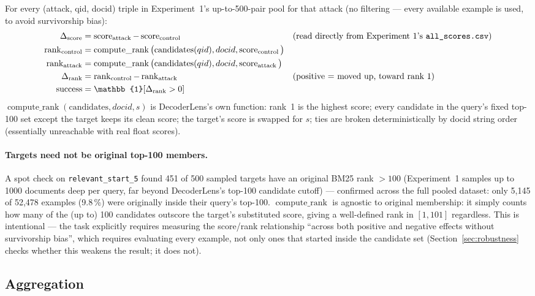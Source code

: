 \documentclass[11pt]{article}
\newcommand{\score}{\operatorname{score}}
\newcommand{\rank}{\operatorname{rank}}
\begin{document}
For every (attack, qid, docid) triple in Experiment~1's up-to-500-pair pool
for that attack (no filtering — every available example is used, to avoid
survivorship bias):
\begin{align}
\Delta_{\score} &= \score_{\text{attack}} - \score_{\text{control}}
  &&\text{(read directly from Experiment~1's \texttt{all\_scores.csv})} \\
\rank_{\text{control}} &= \operatorname{compute\_rank}\big(\text{candidates}(qid), docid, \score_{\text{control}}\big) \\
\rank_{\text{attack}}  &= \operatorname{compute\_rank}\big(\text{candidates}(qid), docid, \score_{\text{attack}}\big) \\
\Delta_{\rank} &= \rank_{\text{control}} - \rank_{\text{attack}}
  &&\text{(positive = moved up, toward rank 1)} \\
\text{success} &= \mathbb{1}[\Delta_{\rank} > 0]
\end{align}
$\operatorname{compute\_rank}(\text{candidates}, docid, s)$ is
DecoderLens's own function: rank~1 is the highest score; every candidate
in the query's fixed top-100 set except the target keeps its clean score;
the target's score is swapped for $s$; ties are broken deterministically by
docid string order (essentially unreachable with real float scores).

\paragraph{Targets need not be original top-100 members.} A spot check on
\texttt{relevant\_start\_5} found 451 of 500 sampled targets have an
original BM25 rank $>100$ (Experiment~1 samples up to 1000 documents deep
per query, far beyond DecoderLens's top-100 candidate cutoff) --- confirmed
across the full pooled dataset: only 5{,}145 of 52{,}478 examples
(9.8\,\%) were originally inside their query's top-100.
$\operatorname{compute\_rank}$ is agnostic to original membership: it
simply counts how many of the (up to) 100 candidates outscore the target's
substituted score, giving a well-defined rank in $[1,101]$ regardless. This
is intentional --- the task explicitly requires measuring the score/rank
relationship ``across both positive and negative effects without
survivorship bias'', which requires evaluating every example, not only
ones that started inside the candidate set (Section~\ref{sec:robustness}
checks whether this weakens the result; it does not).

\subsection{Aggregation}
\end{document}
